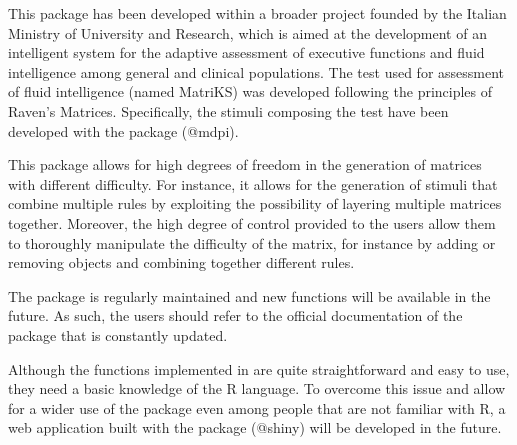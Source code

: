 This package has been developed within a broader project founded by the Italian Ministry of University and Research, which is aimed at the development of an intelligent system for the adaptive assessment of executive functions and fluid intelligence among general and clinical populations.
The test used for assessment of fluid intelligence (named MatriKS) was developed following the principles of Raven's Matrices.
Specifically, the stimuli composing the test have been developed with the  package (@mdpi).

This package allows for high degrees of freedom in the generation of matrices with different difficulty.
For instance, it allows for the generation of stimuli that combine multiple rules by exploiting the possibility of layering multiple matrices together.
Moreover, the high degree of control provided to the users allow them to thoroughly manipulate the difficulty of the matrix, for instance by adding or removing objects and combining together different rules.

The package is regularly maintained and new functions will be available in the future.
As such, the users should refer to the official documentation of the package that is constantly updated.

Although the functions implemented in  are quite straightforward and easy to use, they need a basic knowledge of the R language.
To overcome this issue and allow for a wider use of the package even among people that are not familiar with R, a web application built with the  package (@shiny) will be developed in the future.


\address{%
Quietest Quokka\\
University of Little Mates\\%
Department of Letter Q\\ Somewhere, Australia\\
%
\url{https://www.britannica.com/animal/quokka}\\%
\textit{ORCiD: \href{https://orcid.org/0000-1721-1511-1101}{0000-1721-1511-1101}}\\%
\href{mailto:qquo@ulm.edu}{\nolinkurl{qquo@ulm.edu}}%
}

\address{%
Bounciest Bilby\\
University of Little MatesUniversity of Aussie Animals\\%
Department of Letter Q, Somewhere, Australia\\ Department of Marsupials, Somewhere, Australia\\
%
\url{https://www.britannica.com/animal/bilby}\\%
\textit{ORCiD: \href{https://orcid.org/0000-0002-0912-0225}{0000-0002-0912-0225}}\\%
\href{mailto:bbil@ulm.edu}{\nolinkurl{bbil@ulm.edu}}%
}
